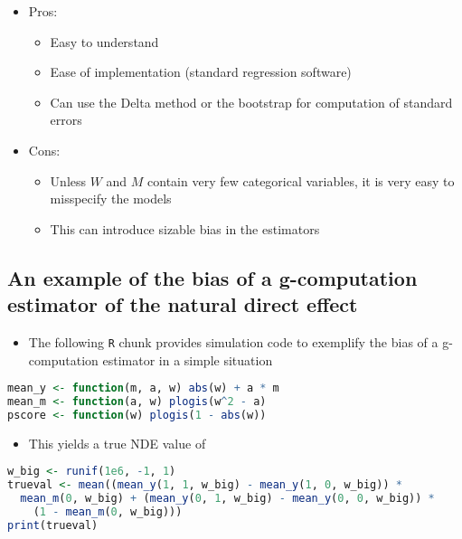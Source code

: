 \documentclass[
  12pt,
]{book}
\newcommand{\passthrough}[1]{#1}
\providecommand{\tightlist}{%
  \setlength{\itemsep}{0pt}\setlength{\parskip}{0pt}}
\theoremstyle{definition}
\theoremstyle{definition}
\theoremstyle{definition}
\newcommand{\1}{\mathbbm{1}}
\begin{document}
\begin{itemize}
\tightlist
\item
  Pros:

  \begin{itemize}
  \tightlist
  \item
    Easy to understand
  \item
    Ease of implementation (standard regression software)
  \item
    Can use the Delta method or the bootstrap for computation of standard errors
  \end{itemize}
\item
  Cons:

  \begin{itemize}
  \tightlist
  \item
    Unless \(W\) and \(M\) contain very few categorical variables, it is very easy
    to misspecify the models
  \item
    This can introduce sizable bias in the estimators
  \end{itemize}
\end{itemize}

\hypertarget{an-example-of-the-bias-of-a-g-computation-estimator-of-the-natural-direct-effect}{%
\subsection{An example of the bias of a g-computation estimator of the natural direct effect}\label{an-example-of-the-bias-of-a-g-computation-estimator-of-the-natural-direct-effect}}

\begin{itemize}
\tightlist
\item
  The following \passthrough{\lstinline!R!} chunk provides simulation code to exemplify the bias of a
  g-computation estimator in a simple situation
\end{itemize}

\begin{lstlisting}[language=R]
mean_y <- function(m, a, w) abs(w) + a * m
mean_m <- function(a, w) plogis(w^2 - a)
pscore <- function(w) plogis(1 - abs(w))
\end{lstlisting}

\begin{itemize}
\tightlist
\item
  This yields a true NDE value of
\end{itemize}

\begin{lstlisting}[language=R]
w_big <- runif(1e6, -1, 1)
trueval <- mean((mean_y(1, 1, w_big) - mean_y(1, 0, w_big)) *
  mean_m(0, w_big) + (mean_y(0, 1, w_big) - mean_y(0, 0, w_big)) *
    (1 - mean_m(0, w_big)))
print(trueval)
\end{lstlisting}
\end{document}
